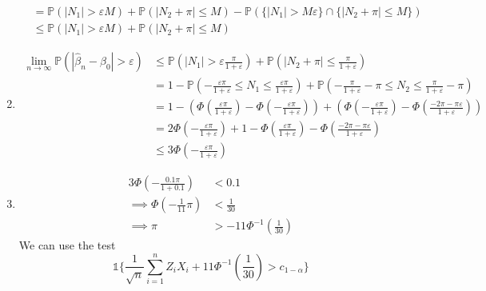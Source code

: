 \documentclass[11pt]{article}
\newcommand{\p}{\mathbb{P}}
\begin{document}
\begin{enumerate}[label=\alph*)]
\begin{align*}
&= \p(|N_1| > \varepsilon M) + \p (|N_2 + \pi| \le M) - \p(\{|N_1| > M \varepsilon\} \cap \{|N_2 + \pi| \le M\})\\
&\le \p (|N_1| > \varepsilon M) + \p (|N_2 + \pi| \le M)
\end{align*}
\item
\begin{align*}
\lim_{n \to \infty} \p (|\hat{\beta}_n - \beta_0| > \varepsilon) &\le \p \left(|N_1| > \varepsilon \frac{\pi}{1 + \varepsilon}\right) + \p \left(|N_2 + \pi| \le \frac{\pi}{1 + \varepsilon}\right)\\
&= 1 - \p \left(- \frac{\varepsilon \pi}{1 + \varepsilon} \le N_1 \le \frac{\varepsilon \pi}{1 + \varepsilon}\right) + \p \left(- \frac{\pi}{1 + \varepsilon} - \pi \le N_2 \le \frac{\pi}{1 + \varepsilon} - \pi\right)\\
&= 1 - \left(\Phi \left(\frac{\varepsilon \pi}{1 + \varepsilon}\right) - \Phi \left(- \frac{\varepsilon \pi}{1+ \varepsilon}\right)\right) + \left(\Phi \left(- \frac{\varepsilon \pi}{1 + \varepsilon}\right) - \Phi \left(\frac{-2 \pi - \pi \varepsilon}{1 + \varepsilon}\right)\right)\\
&= 2 \Phi \left(- \frac{\varepsilon \pi}{1 + \varepsilon}\right) + 1 - \Phi \left(\frac{\varepsilon \pi}{1 + \varepsilon}\right) - \Phi \left(\frac{-2\pi - \pi \varepsilon}{1 + \varepsilon}\right)\\
&\le 3 \Phi \left(-\frac{\varepsilon \pi}{1 + \varepsilon}\right)
\end{align*}
\item
\begin{align*}
3 \Phi \left(- \frac{0.1\pi}{1 + 0.1}\right) &< 0.1\\
\implies \Phi \left(- \frac{1}{11}\pi\right) &< \frac{1}{30}\\
\implies \pi &> -11 \Phi^{-1} \left(\frac{1}{30}\right)
\end{align*}
We can use the test
\[
\mathbb{1}\{\frac{1}{\sqrt{n}}\sum^n_{i = 1} Z_i X_i + 11 \Phi^{-1}\left(\frac{1}{30}\right) > c_{1 - \alpha}\}
\]
\end{enumerate}

\newpage
\end{document}
